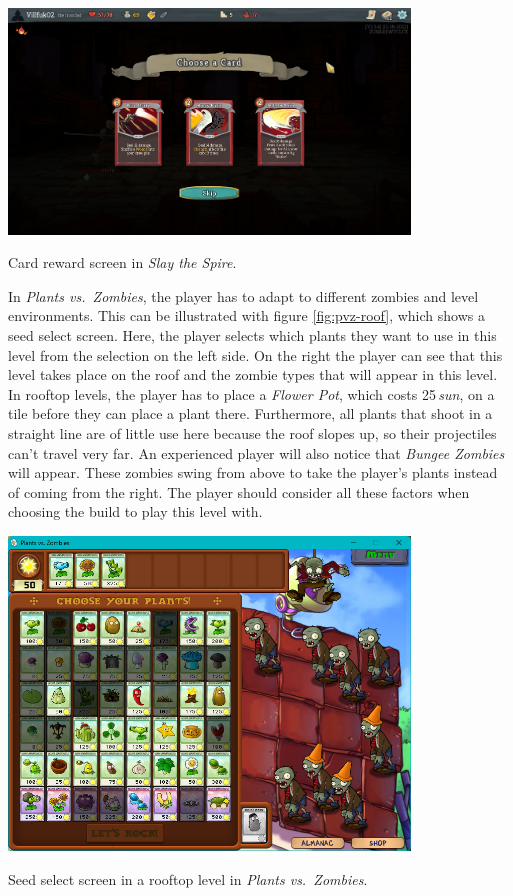 \begin{center}
    \captionsetup{type=figure}
    \includegraphics[width=0.8\textwidth]{img/Slay-the-Spire-Reward.png}
    \caption{Card reward screen in \emph{Slay the Spire}.}
    \label{fig:sts-card-reward}
\end{center}

In \emph{Plants vs.\ Zombies}, the player has to adapt to different zombies and level environments.
This can be illustrated with figure \ref{fig:pvz-roof}, which shows a seed select screen.
Here, the player selects which plants they want to use in this level from the selection on the left side.
On the right the player can see that this level takes place on the roof and the zombie types that will appear in this level.
In rooftop levels, the player has to place a \emph{Flower Pot}, which costs 25\,\emph{sun}, on a tile before they can place a plant there.
Furthermore, all plants that shoot in a straight line are of little use here because the roof slopes up, so their projectiles can't travel very far.
An experienced player will also notice that \emph{Bungee Zombies} will appear.
These zombies swing from above to take the player's plants instead of coming from the right.
The player should consider all these factors when choosing the build to play this level with.

\begin{center}
    \captionsetup{type=figure}
    \includegraphics[width=0.8\textwidth]{img/Plants-vs-Zombies-Rooftop.png}
    \caption{Seed select screen in a rooftop level in \emph{Plants vs.\ Zombies}.}
    \label{fig:pvz-roof}
\end{center}

